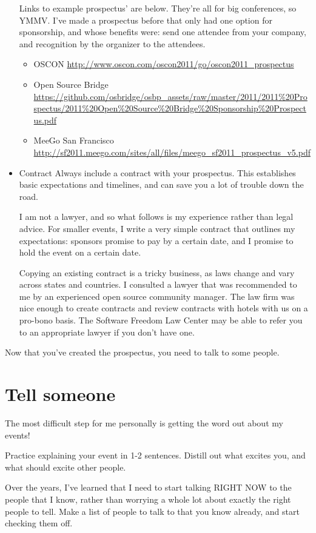 \begin{itemize}
Links to example prospectus’ are below. They’re all for big conferences, so YMMV. I’ve made a prospectus before that only had one option for sponsorship, and whose benefits were: send one attendee from your company, and recognition by the organizer to the attendees. 

\begin{itemize}
\item OSCON \url{http://www.oscon.com/oscon2011/go/oscon2011_prospectus}
\item Open Source Bridge \url{https://github.com/osbridge/osbp_assets/raw/master/2011/2011\%20Prospectus/2011\%20Open\%20Source\%20Bridge\%20Sponsorship\%20Prospectus.pdf}
\item MeeGo San Francisco \url{http://sf2011.meego.com/sites/all/files/meego_sf2011_prospectus_v5.pdf}
\end{itemize}

\item Contract
Always include a contract with your prospectus. This establishes basic expectations and timelines, and can save you a lot of trouble down the road.

I am not a lawyer, and so what follows is my experience rather than legal advice. For smaller events, I write a very simple contract that outlines my expectations: sponsors promise to pay by a certain date, and I promise to hold the event on a certain date.

Copying an existing contract is a tricky business, as laws change and vary across states and countries. I consulted a lawyer that was recommended to me by an experienced open source community manager. The law firm was nice enough to create contracts and review contracts with hotels with us on a pro-bono basis. The Software Freedom Law Center may be able to refer you to an appropriate lawyer if you don’t have one.
\end{itemize}

Now that you’ve created the prospectus, you need to talk to some people.

\section*{Tell someone}
The most difficult step for me personally is getting the word out about my events! 

Practice explaining your event in 1-2 sentences. Distill out what excites you, and what should excite other people.

Over the years, I’ve learned that I need to start talking RIGHT NOW to the people that I know, rather than worrying a whole lot about exactly the right people to tell.  Make a list of people to talk to that you know already, and start checking them off.

